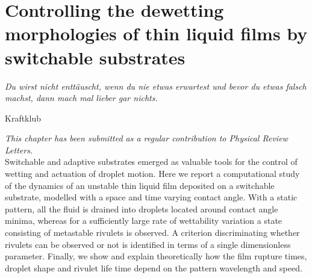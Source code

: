 \chapter{Controlling the dewetting morphologies of thin liquid films by switchable substrates}
\label{chapter:third_paper}
\epigraph{\textit{Du wirst nicht enttäuscht, wenn du nie etwas erwartest und bevor du etwas falsch machst, dann mach mal lieber gar nichts.}}{Kraftklub}

\textit{\small{This chapter has been submitted as a regular contribution to Physical Review Letters.}}\\

Switchable and adaptive substrates emerged as valuable tools for the control of wetting and actuation of droplet motion. 
Here we report a computational study of the dynamics of an unstable thin liquid film deposited on a switchable substrate, modelled with a space and time varying contact angle.
With a static pattern, all the fluid is drained into droplets located around contact angle minima, whereas for a sufficiently large rate of wettability variation a state consisting of metastable rivulets is observed. 
A criterion discriminating whether rivulets can be observed or not is identified in terms of a single dimensionless parameter.
Finally, we show and explain theoretically how the film rupture times, droplet shape and rivulet life time depend on the pattern wavelength and speed.
\\
\newcommand{\ts}{\textsuperscript}

